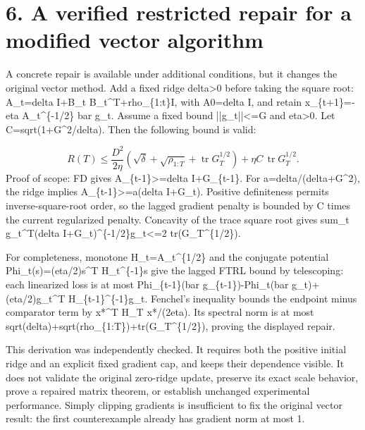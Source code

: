 \documentclass[10pt]{article}
\begin{document}
\section*{6. A verified restricted repair for a modified vector algorithm}
A concrete repair is available under additional conditions, but it changes the original vector method. Add a fixed ridge delta>0 before taking the square root: A\_t=delta I+B\_t B\_t\textasciicircum{}T+rho\_\{1:t\}I, with A0=delta I, and retain x\_\{t+1\}=-eta A\_t\textasciicircum{}\{-1/2\} bar g\_t. Assume a fixed bound ||g\_t||<=G and eta>0. Let C=sqrt(1+G\textasciicircum{}2/delta). Then the following bound is valid:\par
\[R(T)\le\frac{D^2}{2\eta}\left(\sqrt\delta+\sqrt{\rho_{1:T}}+\operatorname{tr}G_T^{1/2}\right)+\eta C\,\operatorname{tr}G_T^{1/2}.\] Proof of scope: FD gives A\_\{t-1\}>=delta I+G\_\{t-1\}. For a=delta/(delta+G\textasciicircum{}2), the ridge implies A\_\{t-1\}>=a(delta I+G\_t). Positive definiteness permits inverse-square-root order, so the lagged gradient penalty is bounded by C times the current regularized penalty. Concavity of the trace square root gives sum\_t g\_t\textasciicircum{}T(delta I+G\_t)\textasciicircum{}\{-1/2\}g\_t<=2 tr(G\_T\textasciicircum{}\{1/2\}).\par
For completeness, monotone H\_t=A\_t\textasciicircum{}\{1/2\} and the conjugate potential Phi\_t(s)=(eta/2)s\textasciicircum{}T H\_t\textasciicircum{}\{-1\}s give the lagged FTRL bound by telescoping: each linearized loss is at most Phi\_\{t-1\}(bar g\_\{t-1\})-Phi\_t(bar g\_t)+(eta/2)g\_t\textasciicircum{}T H\_\{t-1\}\textasciicircum{}\{-1\}g\_t. Fenchel’s inequality bounds the endpoint minus comparator term by x*\textasciicircum{}T H\_T x*/(2eta). Its spectral norm is at most sqrt(delta)+sqrt(rho\_\{1:T\})+tr(G\_T\textasciicircum{}\{1/2\}), proving the displayed repair.\par
This derivation was independently checked. It requires both the positive initial ridge and an explicit fixed gradient cap, and keeps their dependence visible. It does not validate the original zero-ridge update, preserve its exact scale behavior, prove a repaired matrix theorem, or establish unchanged experimental performance. Simply clipping gradients is insufficient to fix the original vector result: the first counterexample already has gradient norm at most 1.\par
\end{document}
